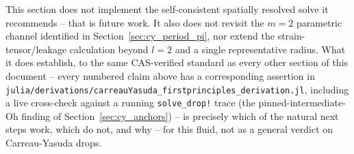 \begin{notebox}[Scope]
This section does not implement the self-consistent spatially resolved
solve it recommends -- that is future work. It also does not revisit the
$m=2$ parametric channel identified in
Section~\ref{sec:cy_period_pi}, nor extend the strain-tensor/leakage
calculation beyond $l=2$ and a single representative radius. What it does
establish, to the same CAS-verified standard as every other section of this
document -- every numbered claim above has a corresponding assertion in
\texttt{julia/derivations/carreauYasuda\_firstprinciples\_derivation.jl},
including a live cross-check against a running \texttt{solve\_drop!} trace
(the pinned-intermediate-Oh finding of
Section~\ref{sec:cy_anchors}) -- is precisely which of the natural next
steps work, which do not, and why -- for this fluid, not as a general
verdict on Carreau-Yasuda drops.
\end{notebox}
